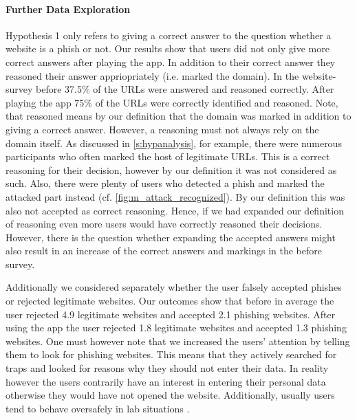 \paragraph{Further Data Exploration}
\begin{description}[leftmargin=0cm]
	\item[Correct and Reasoned Answers:] Hypothesis 1 only refers to giving a correct answer to the question whether a website is a phish or not.
	Our results show that users did not only give more correct answers after playing the app.
	In addition to their correct answer they reasoned their answer appriopriately (i.e. marked the domain).
	In the website-survey before 37.5\% of the URLs were answered and reasoned correctly.
	After playing the app 75\% of the URLs were correctly identified and reasoned. 
	Note, that reasoned means by our definition that the domain was marked in addition to giving a correct answer.
	However, a reasoning must not always rely on the domain itself. 
	As discussed in \autoref{s:hypanalysis}, for example, there were numerous participants who often marked the host of legitimate URLs.
	This is a correct reasoning for their decision, however by our definition it was not considered as such.
	Also, there were plenty of users who detected a phish and marked the attacked part instead (cf. \autoref{fig:m_attack_recognized}).
	By our definition this was also not accepted as correct reasoning.
	Hence, if we had expanded our definition of reasoning even more users would have correctly reasoned their decisions.
	However, there is the question whether expanding the accepted answers might also result in an increase of the correct answers and markings in the before survey.
	\item[False Negatives and Positives:] Additionally we considered separately whether the user falsely  accepted phishes or rejected legitimate websites. Our outcomes show that before in average the user rejected 4.9 legitimate websites and accepted 2.1 phishing websites.
	After using the app the user rejected 1.8 legitimate websites and accepted 1.3 phishing websites.
	One must however note that we increased the users' attention by telling them to look for phishing websites.
	This means that they actively searched for traps and looked for reasons why they should not enter their data.
	In reality however the users contrarily have an interest in entering their personal data otherwise they would have not opened the website.
	Additionally, usually users tend to behave oversafely in lab situations \cite{wu2006security, egelman2007security}.

\end{description}
